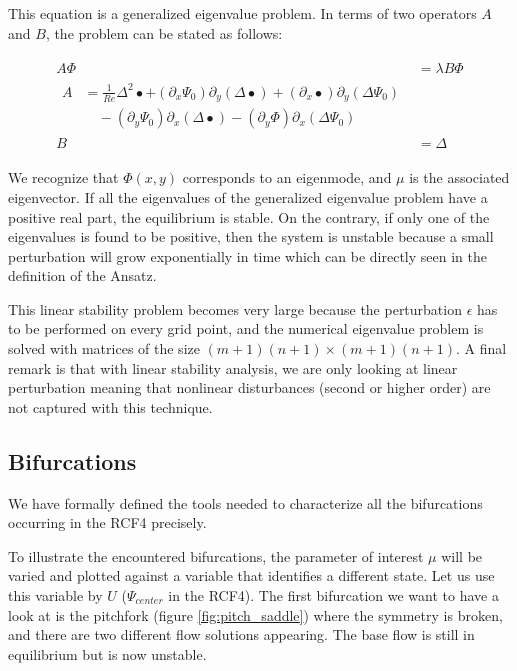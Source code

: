 This equation is a generalized eigenvalue problem. In terms of two operators
$A$ and $B$, the problem can be stated as follows: 

\begin{align} \label{eq:eig_prob}
  \begin{split}
  A \Phi & = \lambda B \Phi \\[4pt]
  \begin{split}
  A & = \frac{1}{Re} \Delta^2 \bullet
    + (\partial_x \Psi_0) \partial_y (\Delta \bullet)
    + (\partial_x \bullet) \partial_y (\Delta \Psi_0) \\
    &\quad - (\partial_y \Psi_0) \partial_x (\Delta \bullet)
    - (\partial_y \Phi) \partial_x (\Delta \Psi_0)
  \end{split} \\
  B & = \Delta
  \end{split}
\end{align}

We recognize that $\Phi(x,y)$ corresponds to an eigenmode, and $\mu$ is the
associated eigenvector. If all the eigenvalues of the generalized eigenvalue
problem have a positive real part, the equilibrium is stable. On the contrary,
if only one of the eigenvalues is found to be positive, then the system is
unstable because a small perturbation will grow exponentially in time which can
be directly seen in the definition of the Ansatz.

This linear stability problem becomes very large because the perturbation
$\epsilon$ has to be performed on every grid point, and the numerical
eigenvalue problem is solved with matrices of the size $(m+1)(n+1) \times
(m+1)(n+1)$. A final remark is that with linear stability analysis, we are only
looking at linear perturbation meaning that nonlinear disturbances (second or
higher order) are not captured with this technique.

\subsection{Bifurcations}

We have formally defined the tools needed to characterize all the bifurcations
occurring in the RCF4 precisely. 

To illustrate the encountered bifurcations, the parameter of interest $\mu$
will be varied and plotted against a variable that identifies a different
state. Let us use this variable by $U$ ($\Psi_{center}$ in the RCF4). The first
bifurcation we want to have a look at is the pitchfork (figure \ref{fig:pitch_saddle})
where the symmetry is broken, and there are two different flow solutions
appearing. The base flow is still in equilibrium but is now unstable.


